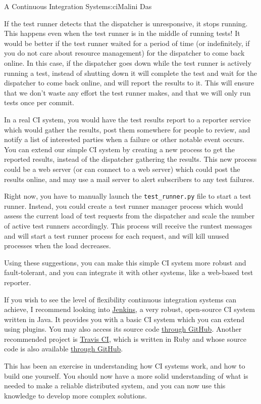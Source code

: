 \begin{aosachapter}{A Continuous Integration System}{s:ci}{Malini Das}
\label{smarter-test-runners}

If the test runner detects that the dispatcher is unresponsive, it stops
running. This happens even when the test runner is in the middle of
running tests! It would be better if the test runner waited for a period
of time (or indefinitely, if you do not care about resource management)
for the dispatcher to come back online. In this case, if the dispatcher
goes down while the test runner is actively running a test, instead of
shutting down it will complete the test and wait for the dispatcher to
come back online, and will report the results to it. This will ensure
that we don't waste any effort the test runner makes, and that we will
only run tests once per commit.

\label{real-reporting}

In a real CI system, you would have the test results report to a
reporter service which would gather the results, post them somewhere for
people to review, and notify a list of interested parties when a failure
or other notable event occurs. You can extend our simple CI system by
creating a new process to get the reported results, instead of the
dispatcher gathering the results. This new process could be a web server
(or can connect to a web server) which could post the results online,
and may use a mail server to alert subscribers to any test failures.

\label{test-runner-manager}

Right now, you have to manually launch the \texttt{test\_runner.py} file
to start a test runner. Instead, you could create a test runner manager
process which would assess the current load of test requests from the
dispatcher and scale the number of active test runners accordingly. This
process will receive the runtest messages and will start a test runner
process for each request, and will kill unused processes when the load
decreases.

Using these suggestions, you can make this simple CI system more robust
and fault-tolerant, and you can integrate it with other systems, like a
web-based test reporter.

If you wish to see the level of flexibility continuous integration
systems can achieve, I recommend looking into
\href{http://jenkins-ci.org/}{Jenkins}, a very robust, open-source CI
system written in Java. It provides you with a basic CI system which you
can extend using plugins. You may also access its source code
\href{https://github.com/jenkinsci/jenkins/}{through GitHub}. Another
recommended project is \href{https://travis-ci.org/}{Travis CI}, which
is written in Ruby and whose source code is also available
\href{https://github.com/travis-ci/travis-ci}{through GitHub}.

This has been an exercise in understanding how CI systems work, and how
to build one yourself. You should now have a more solid understanding of
what is needed to make a reliable distributed system, and you can now
use this knowledge to develop more complex solutions.

\end{aosachapter}
